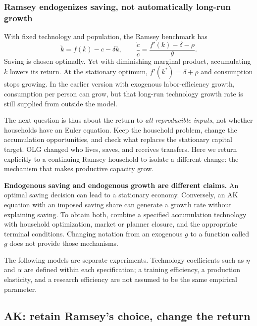 \subsubsection{Ramsey endogenizes saving, not automatically long-run growth}

With fixed technology and population, the Ramsey benchmark has
\begin{equation}
\dot k=f(k)-c-\delta k,\qquad
\frac{\dot c}{c}=\frac{f'(k)-\delta-\rho}{\theta}.
\end{equation}
Saving is chosen optimally. Yet with diminishing marginal product, accumulating
$k$ lowers its return. At the stationary optimum,
$f'(k^*)=\delta+\rho$ and consumption stops growing. In the earlier version
with exogenous labor-efficiency growth, consumption per person can grow, but
that long-run technology growth rate is still supplied from outside the model.

The next question is thus about the return to \emph{all reproducible inputs},
not whether households have an Euler equation. Keep the household problem,
change the accumulation opportunities, and check what replaces the stationary
capital target. OLG changed who lives, saves, and receives transfers. Here we
return explicitly to a continuing Ramsey household to isolate a different
change: the mechanism that makes productive capacity grow.

\begin{blueblock}
\textbf{Endogenous saving and endogenous growth are different claims.}
An optimal saving decision can lead to a stationary economy. Conversely, an
AK equation with an imposed saving share can generate a growth rate without
explaining saving. To obtain both, combine a specified accumulation technology
with household optimization, market or planner closure, and the appropriate
terminal conditions. Changing notation from an exogenous $g$ to a function
called $g$ does not provide those mechanisms.
\end{blueblock}

The following models are separate experiments. Technology coefficients such
as $\eta$ and $\alpha$ are defined within each specification; a training
efficiency, a production elasticity, and a research efficiency are not assumed
to be the same empirical parameter.

\subsection{AK: retain Ramsey's choice, change the return}

